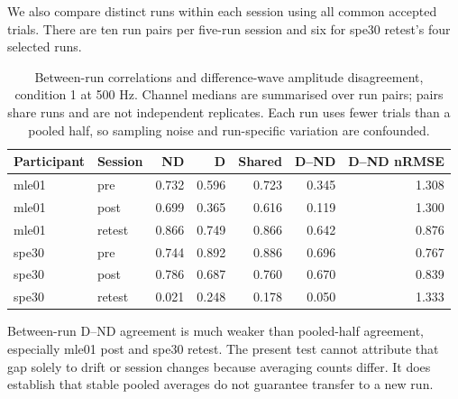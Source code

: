 \documentclass[11pt,a4paper]{article}
\begin{document}
We also compare distinct runs within each session using all common accepted trials. There are ten run pairs per five-run session and six for spe30 retest's four selected runs.
\begin{table}[H]\centering\small
\begin{tabular}{@{}llrrrrr@{}}\toprule
Participant & Session & ND & D & Shared & D--ND & D--ND nRMSE\\\midrule
mle01 & pre & 0.732 & 0.596 & 0.723 & 0.345 & 1.308 \\
mle01 & post & 0.699 & 0.365 & 0.616 & 0.119 & 1.300 \\
mle01 & retest & 0.866 & 0.749 & 0.866 & 0.642 & 0.876 \\
spe30 & pre & 0.744 & 0.892 & 0.886 & 0.696 & 0.767 \\
spe30 & post & 0.786 & 0.687 & 0.760 & 0.670 & 0.839 \\
spe30 & retest & 0.021 & 0.248 & 0.178 & 0.050 & 1.333 \\
\bottomrule\end{tabular}
\caption{Between-run correlations and difference-wave amplitude disagreement, condition 1 at 500 Hz. Channel medians are summarised over run pairs; pairs share runs and are not independent replicates. Each run uses fewer trials than a pooled half, so sampling noise and run-specific variation are confounded.}\label{tab:runs}
\end{table}
Between-run D--ND agreement is much weaker than pooled-half agreement, especially mle01 post and spe30 retest. The present test cannot attribute that gap solely to drift or session changes because averaging counts differ. It does establish that stable pooled averages do not guarantee transfer to a new run.
\clearpage
\end{document}
